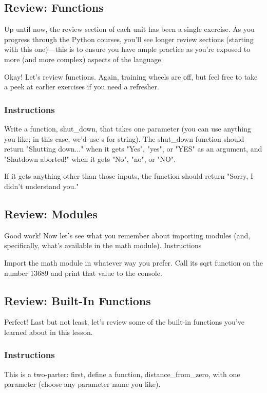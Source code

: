 \documentclass[12pt,a4paper,final,twoside,onecolumn,titlepage]{book}
\begin{document}
\subsection{Review: Functions}

Up until now, the review section of each unit has been a single exercise. As you progress through the Python courses, you'll see longer review sections (starting with this one)—this is to ensure you have ample practice as you're exposed to more (and more complex) aspects of the language.

Okay! Let's review functions. Again, training wheels are off, but feel free to take a peek at earlier exercises if you need a refresher.
\subsubsection{Instructions}

Write a function, shut\_down, that takes one parameter (you can use anything you like; in this case, we'd use s for string). The shut\_down function should return "Shutting down..." when it gets "Yes", "yes", or "YES" as an argument, and "Shutdown aborted!" when it gets "No", "no", or "NO".

If it gets anything other than those inputs, the function should return "Sorry, I didn't understand you."

\subsection{Review: Modules}

Good work! Now let's see what you remember about importing modules (and, specifically, what's available in the math module).
Instructions

Import the math module in whatever way you prefer. Call its sqrt function on the number 13689 and print that value to the console.

\subsection{Review: Built-In Functions}

Perfect! Last but not least, let's review some of the built-in functions you've learned about in this lesson.
\subsubsection{Instructions}

This is a two-parter: first, define a function, distance\_from\_zero, with one parameter (choose any parameter name you like).
\end{document}
